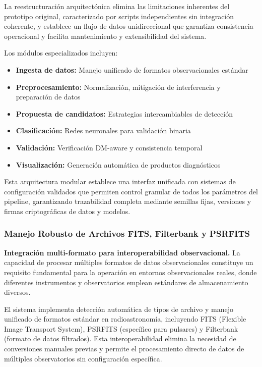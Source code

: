 La reestructuración arquitectónica elimina las limitaciones inherentes del prototipo original, caracterizado por scripts independientes sin integración coherente, y establece un flujo de datos unidireccional que garantiza consistencia operacional y facilita mantenimiento y extensibilidad del sistema.

Los módulos especializados incluyen:
\begin{itemize}
\item \textbf{Ingesta de datos:} Manejo unificado de formatos observacionales estándar
\item \textbf{Preprocesamiento:} Normalización, mitigación de interferencia y preparación de datos
\item \textbf{Propuesta de candidatos:} Estrategias intercambiables de detección
\item \textbf{Clasificación:} Redes neuronales para validación binaria
\item \textbf{Validación:} Verificación DM-aware y consistencia temporal
\item \textbf{Visualización:} Generación automática de productos diagnósticos
\end{itemize}

Esta arquitectura modular establece una interfaz unificada con sistemas de configuración validados que permiten control granular de todos los parámetros del pipeline, garantizando trazabilidad completa mediante semillas fijas, versiones y firmas criptográficas de datos y modelos.

\subsubsection{Manejo Robusto de Archivos FITS, Filterbank y PSRFITS}

\noindent\textbf{Integración multi-formato para interoperabilidad observacional.} La capacidad de procesar múltiples formatos de datos observacionales constituye un requisito fundamental para la operación en entornos observacionales reales, donde diferentes instrumentos y observatorios emplean estándares de almacenamiento diversos.

El sistema implementa detección automática de tipos de archivo y manejo unificado de formatos estándar en radioastronomía, incluyendo FITS (Flexible Image Transport System), PSRFITS (específico para pulsares) y Filterbank (formato de datos filtrados). Esta interoperabilidad elimina la necesidad de conversiones manuales previas y permite el procesamiento directo de datos de múltiples observatorios sin configuración específica.

